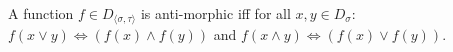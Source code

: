 %
A function $f\in D_{\langle\sigma,\tau\rangle}$ is anti-morphic iff for all $x,y\in D_\sigma$:\\ $f(x\lor y)\Leftrightarrow(f(x)\land f(y))$ and $f(x\land y)\Leftrightarrow(f(x)\lor f(y))$.%
